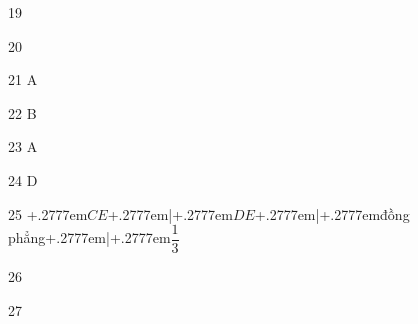 \begin{Solution}{19}
\end{Solution}
\begin{Solution}{20}
\end{Solution}
\begin{Solution}{21}
A
\end{Solution}
\begin{Solution}{22}
B
\end{Solution}
\begin{Solution}{23}
A
\end{Solution}
\begin{Solution}{24}
D
\end{Solution}
\def\numCellsAnsBox{3}%
\begin{Solution}{25}
\protect \leavevmode@ifvmode \kern +.2777em\relax $CE$\protect \leavevmode@ifvmode \kern +.2777em\relax \big|\protect \leavevmode@ifvmode \kern +.2777em\relax $DE$\protect \leavevmode@ifvmode \kern +.2777em\relax \big|\protect \leavevmode@ifvmode \kern +.2777em\relax đồng phẳng\protect \leavevmode@ifvmode \kern +.2777em\relax \big|\protect \leavevmode@ifvmode \kern +.2777em\relax $\dfrac {1}{3}$
\end{Solution}
\begin{Solution}{26}
\end{Solution}
\begin{Solution}{27}
\end{Solution}
